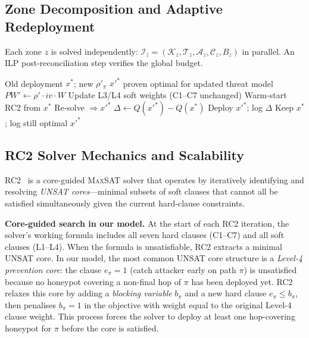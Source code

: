 \documentclass[journal]{IEEEtran}
\newcommand{\maxsat}{\textsc{MaxSAT}}
\newcommand{\calK}{\mathcal{K}}
\newcommand{\calT}{\mathcal{T}}
\newcommand{\calA}{\mathcal{A}}
\newcommand{\calC}{\mathcal{C}}
\begin{document}
\subsection{Zone Decomposition and Adaptive Redeployment}

Each zone $z$ is solved independently:
$\mathcal{I}_z=(\calK_z,\calT_z,\calA_z,\calC_z,B_z)$
in parallel.
An ILP post-reconciliation step verifies the global budget.

\begin{algorithm}[htbp]
\caption{Adaptive Redeployment When Threat Priors Change}
\label{alg:redeploy}
\begin{algorithmic}[1]
\REQUIRE Old deployment $x^*$; new $\rho'_\pi$
\ENSURE  $x'^*$ proven optimal for updated threat model
\STATE $PW'\leftarrow\rho'\cdot iv\cdot W$
\STATE Update L3/L4 soft weights (C1--C7 unchanged)
\STATE Warm-start RC2 from $x^*$
\STATE Re-solve $\Rightarrow x'^*$
\STATE $\Delta\leftarrow Q(x'^*)-Q(x^*)$
\STATE Deploy $x'^*$; log $\Delta$
\ELSE\STATE Keep $x^*$; log still optimal\ENDIF
\RETURN $x'^*$
\end{algorithmic}
\end{algorithm}


\subsection{RC2 Solver Mechanics and Scalability}
\label{subsec:rc2_mechanics}

RC2~\cite{narodytska2014} is a core-guided \maxsat{}
solver that operates by iteratively identifying and
resolving \emph{UNSAT cores}---minimal subsets of soft
clauses that cannot all be satisfied simultaneously
given the current hard-clause constraints.

\textbf{Core-guided search in our model.}
At the start of each RC2 iteration, the solver's working
formula includes all seven hard clauses (C1--C7) and all
soft clauses (L1--L4).
When the formula is unsatisfiable, RC2 extracts a minimal
UNSAT core.
In our model, the most common UNSAT core structure is a
\emph{Level-4 prevention core}: the clause
$e_\pi = 1$ (catch attacker early on path $\pi$) is
unsatisfied because no honeypot covering a non-final hop
of $\pi$ has been deployed yet.
RC2 relaxes this core by adding a \emph{blocking variable}
$b_\pi$ and a new hard clause $e_\pi \leq b_\pi$,
then penalises $b_\pi=1$ in the objective with weight
equal to the original Level-4 clause weight.
This process forces the solver to deploy at least one
hop-covering honeypot for $\pi$ before the core is
satisfied.
\end{document}
